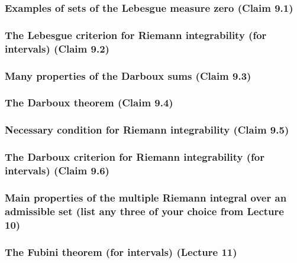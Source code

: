 \subsubsection{Examples of sets of the Lebesgue measure zero (Claim 9.1)}

\subsubsection{The Lebesgue criterion for Riemann integrability (for intervals) (Claim 9.2)}

\subsubsection{Many properties of the Darboux sums (Claim 9.3)}

\subsubsection{The Darboux theorem (Claim 9.4)}

\subsubsection{Necessary condition for Riemann integrability (Claim 9.5)}

\subsubsection{The Darboux criterion for Riemann integrability (for intervals) (Claim 9.6)}

\subsubsection{Main properties of the multiple Riemann integral over an admissible set (list any three of your choice from Lecture 10)}

\subsubsection{The Fubini theorem (for intervals) (Lecture 11)}

\clearpage